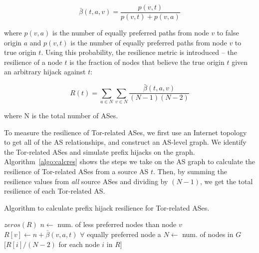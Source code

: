 \begin{equation}
\bar{\beta}(t,a,v) = \frac {p(v,t)} {p(v,t) + p(v,a)}
\end{equation}

where $p(v,a)$ is the number of equally preferred paths from node $v$ to false origin $a$ and $p(v,t)$ is the number of equally preferred paths from node $v$ to true origin $t$.  Using this probability, the resilience metric is introduced -- the resilience of a node $t$ is the fraction of nodes that believe the true origin $t$ given an arbitrary hijack against $t$:

\begin{equation}
R(t) = \sum_{a \in N} \sum_{v \in N} \frac {\bar{\beta}(t,a,v)} {(N-1)(N-2)}
\end{equation}

where N is the total number of ASes.

To measure the resilience of Tor-related ASes, we first use an Internet topology~\cite{caida} to get all of the AS relationships, and construct an AS-level graph.  We identify the Tor-related ASes and simulate prefix hijacks on the graph. Algorithm~\ref{algo:calcres} shows the steps we take on the AS graph to calculate the resilience of Tor-related ASes from a source AS $t$. Then, by summing the resilience values from \emph{all} source ASes and dividing by $(N-1)$, we get the total resilience of each Tor-related AS.



\begin{algorithm}
\caption{Algorithm to calculate prefix hijack resilience for Tor-related ASes.}
\label{algo:calcres}
\begin{algorithmic}
    \State {}
    \State $zeros(R)$
		\State $n \gets $ num. of less preferred nodes than node $v$
		\State $R[v] \gets n + \bar{\beta}(v,a,t)$ $\forall$ equally preferred node a
	\EndIf
    \EndFor
    \State $N \gets$ num. of nodes in $G$
    \State \Return $[R[i] / (N-2)$ for each node $i$ in $R]$
\EndFunction
\end{algorithmic}
\end{algorithm}

